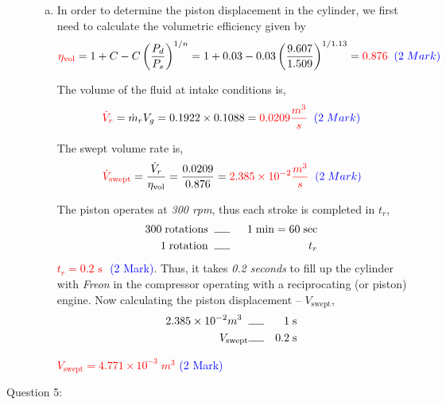 \documentclass[12pt,twoside]{report}
\newcommand{\frc}{\displaystyle\frac}
\newcommand{\uline}[1]{\rule[0pt]{#1}{0.4pt}}%
\begin{document}
\begin{description}
\begin{enumerate}[(a)]
\item In order to determine the piston displacement in the cylinder, we first need to calculate the volumetric efficiency given by
\begin{displaymath}
\textcolor{red}{\eta_{\text{vol}}} = 1 + C - C\left(\frc{P_{d}}{P_{s}}\right)^{1/n} = 1 + 0.03 - 0.03\left( \frc{9.607}{1.509}\right)^{1/1.13}=\textcolor{red}{0.876} \;\;\textcolor{blue}{(2\; Mark)}
\end{displaymath}

The volume of the fluid at intake conditions is,
\begin{displaymath}
\textcolor{red}{\dot{V}_{r}}=\dot{m}_{r}V_{g}=0.1922 \times 0.1088 = \textcolor{red}{0.0209\frc{m^{3}}{s}} \;\;\textcolor{blue}{(2\; Mark)}
\end{displaymath}

The swept volume rate is,
\begin{displaymath}
\textcolor{red}{\dot{V}_{\text{swept}}} = \frc{\dot{V}_{r}}{\eta_{\text{vol}}} = \frc{0.0209}{0.876} = \textcolor{red}{2.385\times 10^{-2}\frc{m^{3}}{s}} \;\;\textcolor{blue}{(2\; Mark)}
\end{displaymath}

The piston operates at {\it 300 rpm}, thus each stroke is completed in $t_{r}$,
\begin{eqnarray}
300 \;\text{rotations} \;\; &\uline{0.5cm}& \;\;1\;\text{min}=60\;\text{sec} \nonumber\\
1 \;\text{rotation} \;\; &\uline{0.5cm}& \;\; t_{r} \nonumber\\
\end{eqnarray}
\textcolor{red}{$t_{r}=0.2\text{ s }$} \textcolor{blue}{(2\; Mark)}. Thus, it takes {\it 0.2 seconds} to fill up the cylinder with {\it Freon} in the compressor operating with a reciprocating (or piston) engine. Now calculating the piston displacement -- $V_{\text{swept}}$,
\begin{eqnarray}
2.385\times 10^{-2} m^{3} \;\; &\uline{0.5cm}& \;\; 1\;\text{s} \nonumber \\
V_{\text{swept}}                &\uline{0.5cm}& 0.2\;\text{s} \nonumber
\end{eqnarray}

\textcolor{red}{$V_{\text{swept}}=4.771\times 10^{-3}\;m^{3}$} \textcolor{blue}{(2\; Mark)}

\end{enumerate}
\clearpage

\item [Question 5:] 


\end{description}
\end{document}
